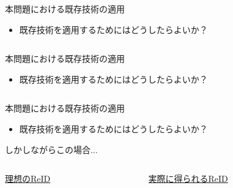 \begin{frame}{本問題における既存技術の適用}
    \begin{itemize}
        \item 既存技術を適用するためにはどうしたらよいか？
    \end{itemize}
    \phantom{\ra しかしながらこの場合$\dots$}
    \vs
    \begin{columns}
        \begin{column}{.5\linewidth}
        \end{column}
        \begin{column}{.5\linewidth}
        \end{column}
    \end{columns}
\end{frame}
\begin{frame}[noframenumbering]{本問題における既存技術の適用}
    \begin{itemize}
        \item 既存技術を適用するためにはどうしたらよいか？
    \end{itemize}
    \phantom{\ra しかしながらこの場合$\dots$}
    \vs
    \begin{columns}
        \begin{column}{.5\linewidth}
        \end{column}
        \begin{column}{.5\linewidth}
        \end{column}
    \end{columns}
\end{frame}
\begin{frame}[noframenumbering]{本問題における既存技術の適用}
    \begin{itemize}
        \item 既存技術を適用するためにはどうしたらよいか？
    \end{itemize}
    \ra しかしながらこの場合$\dots$
    \vs
    \begin{columns}
        \begin{column}{.5\linewidth}
            \uline{理想のReID}
        \end{column}
        \begin{column}{.5\linewidth}
            \uline{実際に得られるReID}
        \end{column}
    \end{columns}
\end{frame}

